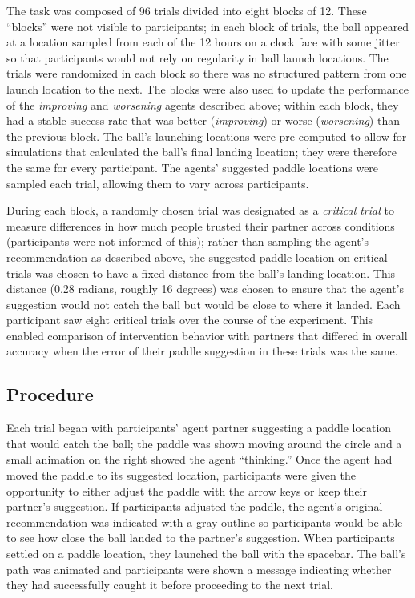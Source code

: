 \documentclass[10pt,letterpaper]{article}
\begin{document}
The task was composed of 96 trials divided into eight blocks of 12. These ``blocks'' were not visible to participants; in each block of trials, the ball appeared at a location sampled from each of the 12 hours on a clock face with some jitter so that participants would not rely on regularity in ball launch locations. The trials were randomized in each block so there was no structured pattern from one launch location to the next. The blocks were also used to update the performance of the \textit{improving} and \textit{worsening} agents described above; within each block, they had a stable success rate that was better (\textit{improving}) or worse (\textit{worsening}) than the previous block. The ball's launching locations were pre-computed to allow for simulations that calculated the ball's final landing location; they were therefore the same for every participant. The agents' suggested paddle locations were sampled each trial, allowing them to vary across participants. 

During each block, a randomly chosen trial was designated as a \textit{critical trial} to measure differences in how much people trusted their partner across conditions (participants were not informed of this); rather than sampling the agent's recommendation as described above, the suggested paddle location on critical trials was chosen to have a fixed distance from the ball's landing location. This distance (0.28 radians, roughly 16 degrees) was chosen to ensure that the agent's suggestion would not catch the ball but would be close to where it landed. Each participant saw eight critical trials over the course of the experiment. This enabled comparison of intervention behavior with partners that differed in overall accuracy when the error of their paddle suggestion in these trials was the same. 


\subsection{Procedure}

Each trial began with participants' agent partner suggesting a paddle location that would catch the ball; the paddle was shown moving around the circle and a small animation on the right showed the agent ``thinking.'' Once the agent had moved the paddle to its suggested location, participants were given the opportunity to either adjust the paddle with the arrow keys or keep their partner's suggestion. If participants adjusted the paddle, the agent's original recommendation was indicated with a gray outline so participants would be able to see how close the ball landed to the partner's suggestion. When participants settled on a paddle location, they launched the ball with the spacebar. The ball's path was animated and participants were shown a message indicating whether they had successfully caught it before proceeding to the next trial. 
\end{document}
